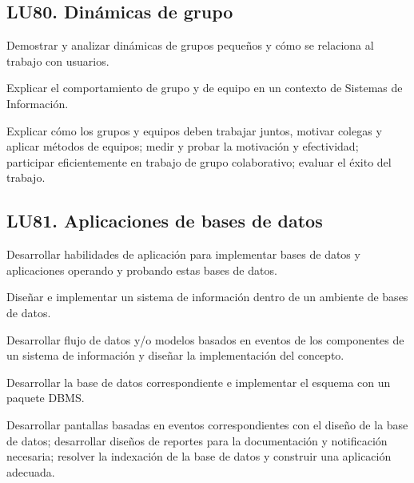 \subsection{LU80. Dinámicas de grupo}\label{sec:BOK-LU80}\label{sec:LU80}
\begin{LearningUnit}
\begin{LUGoal}
\item Demostrar y analizar dinámicas de grupos pequeños y cómo se relaciona al trabajo con usuarios.
\end{LUGoal}

\begin{LUObjective}
\item Explicar el comportamiento de grupo y de equipo en un contexto de Sistemas de Información.
\item Explicar cómo los grupos y equipos deben trabajar juntos, motivar colegas y aplicar métodos de equipos; medir y probar la motivación y efectividad; participar eficientemente en trabajo de grupo colaborativo; evaluar el éxito del trabajo.
\end{LUObjective}
\end{LearningUnit}

\subsection{LU81. Aplicaciones de bases de datos}\label{sec:BOK-LU81}\label{sec:LU81}
\begin{LearningUnit}
\begin{LUGoal}
\item Desarrollar habilidades de aplicación para implementar bases de datos y aplicaciones operando y probando estas bases de datos.
\end{LUGoal}

\begin{LUObjective}
\item Diseñar e implementar un sistema de información dentro de un ambiente de bases de datos.
\item Desarrollar flujo de datos y/o modelos basados en eventos de los componentes de un sistema de información y diseñar la implementación del concepto.
\item Desarrollar la base de datos correspondiente e implementar el esquema con un paquete DBMS.
\item Desarrollar pantallas basadas en eventos correspondientes con el diseño de la base de datos; desarrollar diseños de reportes para la documentación y notificación necesaria; resolver la indexación de la base de datos y construir una aplicación adecuada.
\end{LUObjective}
\end{LearningUnit}

